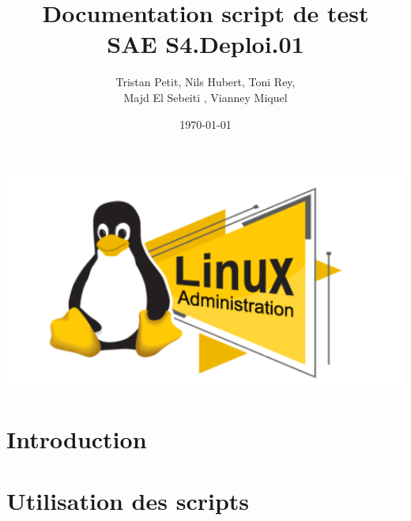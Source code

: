 \documentclass{article}
\begin{document}
\title{Documentation script de test \\ SAE S4.Deploi.01}
\author{Tristan Petit, Nils Hubert, Toni Rey,\\ 
 Majd El Sebeiti , Vianney Miquel}
\date{\today}
\maketitle
\begin{center}
    \centering
    \vspace{1cm} %
    \includegraphics[width=1\textwidth]{Images/Logo-script-test.png} %
\end{center}

\maketitle

\newpage
\renewcommand{\contentsname}{Table des matières}

\tableofcontents

\newpage
{}

\section{Introduction}


\section{Utilisation des scripts}

\end{document}
